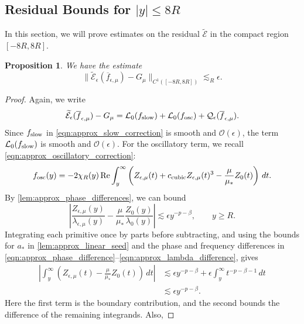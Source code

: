 \documentclass[11pt]{amsart}
\newtheorem{proposition}[theorem]{Proposition}
\theoremstyle{definition}
\theoremstyle{remark}
\numberwithin{equation}{section}
\newcommand{\sq}[1]{\widetilde{#1}}
\newcommand{\mc}[1]{\mathcal{#1}}
\newcommand{\ov}[1]{\overline{#1}}
\begin{document}
\subsection{Residual Bounds for \texorpdfstring{$|y| \leq 8R$}{|y| <= 8R}} 

In this section, we will prove estimates on the residual $\sq{\mc{E}}$ in the compact region $[-8R, 8R]$.

\begin{proposition}\label{prop:approx_residual_compact}
    We have the estimate 
    \[\|\sq{\mc{E}}_\epsilon(\ov{f}_{\epsilon, \mu}) - G_\mu\|_{C^1([-8R, 8R])} \lesssim_R \epsilon.\]
\end{proposition}

\begin{proof}
    Again, we write
    \[\sq{\mc{E}}_\epsilon(\ov{f}_{\epsilon, \mu}) - G_\mu = \mc{L}_0(f_{\textup{slow}}) + \mc{L}_0(f_{\textup{osc}}) + \mc{Q}_\epsilon(\ov{f}_{\epsilon, \mu}).\]
    Since $f_{\textup{slow}}$ in \eqref{eqn:approx_slow_correction} is smooth and $\mc{O}(\epsilon)$, the term $\mc{L}_0(f_{\textup{slow}})$ is smooth and $\mc{O}(\epsilon)$. For the oscillatory term, we recall \eqref{eqn:approx_oscillatory_correction}:
    \[f_{\textup{osc}}(y) = -2 \chi_R(y)\operatorname{Re} \int_{y}^{\infty}\left(Z_{\epsilon, \mu}(t) + c_{\textup{cubic}}Z_{\epsilon, \mu}(t)^3 - \frac{\mu}{\mu_*}Z_0(t)\right) \, dt.\]
    By \cref{lem:approx_phase_differences}, we can bound
    \[
        \left|\frac{Z_{\epsilon,\mu}(y)}{\lambda_{\epsilon,\mu}(y)}
        -\frac{\mu}{\mu_*}\frac{Z_0(y)}{\lambda_0(y)}\right|
        \lesssim\epsilon y^{-p-\beta},\qquad y\geq R.
    \]
    Integrating each primitive once by parts before subtracting, and using the bounds for $a_*$ in \cref{lem:approx_linear_seed} and the phase and frequency differences in \eqref{eqn:approx_phase_difference}--\eqref{eqn:approx_lambda_difference}, gives
    \begin{equation}\label{eqn:approx_oscillatory_primitive_difference}
    \begin{aligned}
        \left|\int_y^\infty\left(Z_{\epsilon,\mu}(t)-\frac{\mu}{\mu_*}Z_0(t)\right)\,dt\right|
        &\lesssim\epsilon y^{-p-\beta}
        +\epsilon\int_y^\infty t^{-p-\beta-1}\,dt\\
        &\lesssim\epsilon y^{-p-\beta}.
    \end{aligned}
    \end{equation}
    Here the first term is the boundary contribution, and the second bounds the difference of the remaining integrands. Also,

\end{proof}
\end{document}
